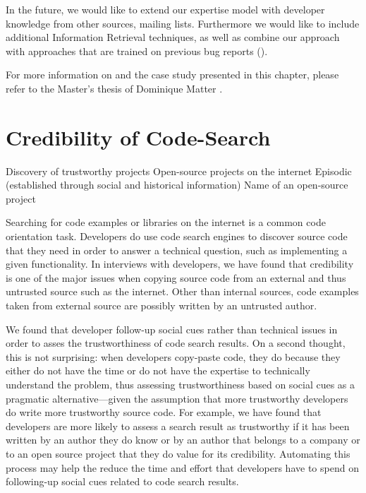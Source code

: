 In the future, we would like to extend our expertise model with developer knowledge from other sources, \eg mailing lists. Furthermore we would like to include additional Information Retrieval techniques, as well as combine our approach with approaches that are trained on previous bug reports (\eg \cite{Anvi06a, Canf05a, Cubr04b, Lucc02a}).

For more information on \DEVLECT and the case study presented in this chapter, please refer to the Master's thesis of Dominique Matter \cite{Matt09a}.



\chapter{Credibility of Code-Search}
\label{the chapter on codesearch}

\infobox
	{Discovery of trustworthy projects}
	{Open-source projects on the internet}
	{Episodic (established through social and historical information)}
	{Name of an open-source project}

Searching for code examples or libraries on the internet is a common code orientation task. Developers do use code search engines to discover source code that they need in order to answer a technical question, such as implementing a given functionality. In interviews with developers, we have found that credibility is one of the major issues when copying source code from an external and thus untrusted source such as the internet. Other than internal sources, code examples taken from external source are possibly written by an untrusted author.

We found that developer follow-up social cues rather than technical issues in order to asses the trustworthiness of code search results. On a second thought, this is not surprising: when developers copy-paste code, they do because they either do not have the time or do not have the expertise to technically understand the problem, thus assessing trustworthiness based on social cues as a pragmatic alternative---given the assumption that more trustworthy developers do write more trustworthy source code. For example, we have found that developers are more likely to assess a search result as trustworthy if it has been written by an author they do know or by an author that belongs to a company or to an open source project that they do value for its credibility. Automating this process may help the reduce the time and effort that developers have to spend on following-up social cues related to code search results.


